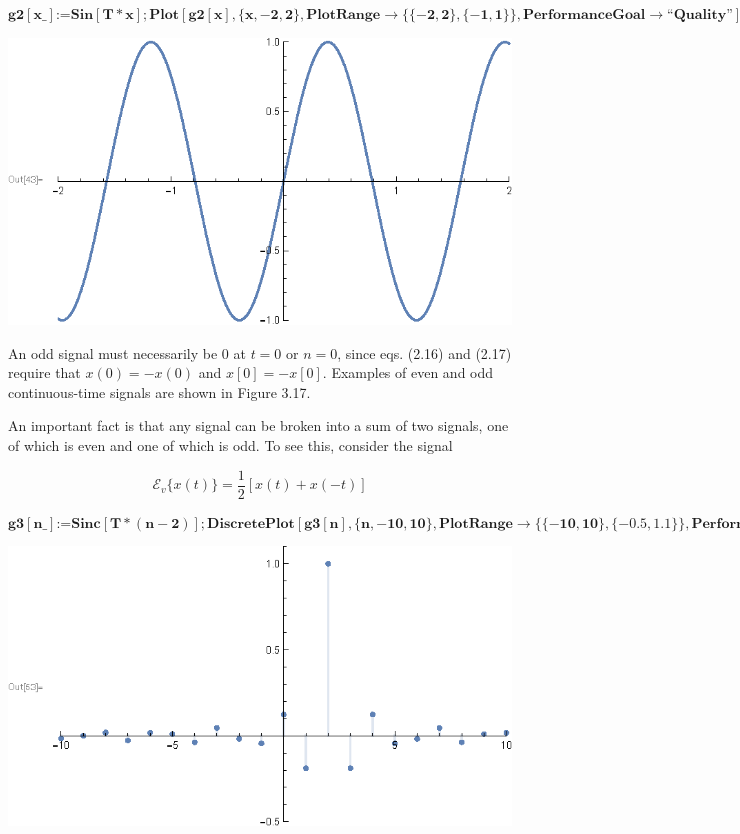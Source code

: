 \documentclass{report}
\begin{document}
\begin{doublespace}
\noindent\(\pmb{\text{g2}[\text{x$\_$}]\text{:=}\text{Sin}[T*x];\text{Plot}[\text{g2}[x], \{x, -2,2\},\text{PlotRange}\to \{\{-2,2\},\{-1,1\}\},\text{PerformanceGoal}\to
\text{{``}Quality{''}}]}\)
\end{doublespace}

\includegraphics{GhassaneAniba_Signals_Systems_Oppenheim_Chap1_gr12.eps}

An odd signal must necessarily be \(0\) at \(t = 0\) or \(n = 0\), since eqs. (2.16) and (2.17) require that \(x(0) = - x(0)\) and \(x [0] = - x
[0]\). Examples of even and odd continuous-time signals are shown in Figure 3.17.

An important fact is that any signal can be broken into a sum of two signals, one of which is even and one of which is odd. To see this, consider
the signal

\begin{equation}
\mathcal{E}_v\{x(t)\}=\frac{1}{2}[x(t)+x(-t)]
\end{equation}

\begin{doublespace}
\noindent\(\pmb{\text{g3}[\text{n$\_$}]\text{:=}\text{Sinc}[T*(n-2)];\text{DiscretePlot}[\text{g3}[n], \{n, -10,10\},\text{PlotRange}\to \{\{-10,10\},\{-0.5,1.1\}\},\text{PerformanceGoal}\to
\text{{``}Quality{''}}]}\)
\end{doublespace}

\includegraphics{GhassaneAniba_Signals_Systems_Oppenheim_Chap1_gr13.eps}
\end{document}
